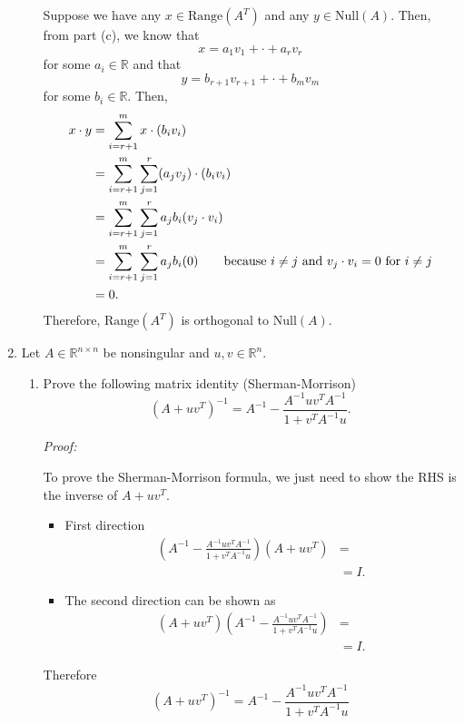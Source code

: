 \documentclass[a4paper,12pt]{article}
\newcommand{\reals}{\mathbb{R}}
\newcommand{\nul}{\mathrm{Null}}
\newcommand{\rng}{\mathrm{Range}}
\newenvironment{proof}[2][$\square$]
    {\setlength{\parskip}{0pt}\par\textit{Proof:} #2\setlength{\parskip}{0.25cm}
        \savebox{\qed}{#1}
        \begin{adjustwidth}{\widthof{Proof:}}{}
    }
    {
        \hfill\usebox{\qed}\end{adjustwidth}
    }
\begin{document}
\begin{enumerate}[label = \arabic*.]
\begin{enumerate}[label = (\alph*)]
				Suppose we have any $ x \in \rng(A^T) $ and any $ y \in \nul(A) $. Then, from part (c), we know that 
				\[
					x = a_1 v_1 + \cdot + a_r v_r
				\]
				for some $ a_i \in \reals $ and that
				\[
				y = b_{r + 1} v_{r + 1} + \cdot + b_m v_m
				\]
				for some $ b_i \in \reals $. Then, 
				\begin{align*}
					x \cdot y &= \sum_{i = r + 1}^{m} x \cdot (b_i v_i) \\
					&= \sum_{i = r + 1}^{m} \sum_{j = 1}^{r} (a_j v_j) \cdot (b_i v_i) \\
					&= \sum_{i = r + 1}^{m} \sum_{j = 1}^{r} a_j b_i (v_j \cdot v_i) \\
					&= \sum_{i = r + 1}^{m} \sum_{j = 1}^{r} a_j b_i (0) \qquad \text{because $ i \neq j $ and $ v_j \cdot v_i = 0 $ for $ i \neq j $} \\
					&= 0.
				\end{align*}
				Therefore, $ \rng(A^T) $ is orthogonal to $ \nul(A) $.
			\end{enumerate}
		
		\item Let $ A \in \reals^{n \times n} $	be nonsingular and $ u, v \in \reals^n $.
			\begin{enumerate}[label = (\alph*)]
				\item Prove the following matrix identity (Sherman-Morrison)
				\[
					(A + u v^T)^{-1} = A^{-1} - \frac{A^{-1} u v^T A^{-1}}{1 + v^T A^{-1} u}.
				\]
				
				\begin{proof}{}
					To prove the Sherman-Morrison formula, we just need to show the RHS is the inverse of $ A + uv^T $.
					\begin{itemize}
						\item First direction
						\begin{align*}
							\left(A^{-1} - \frac{A^{-1} u v^T A^{-1}}{1 + v^T A^{-1} u}\right) (A + u v^T) &= \\
							&= I.
						\end{align*}
					\item The second direction can be shown as
						\begin{align*}
							(A + u v^T) \left(A^{-1} - \frac{A^{-1} u v^T A^{-1}}{1 + v^T A^{-1} u}\right) &= \\
							&= I.
						\end{align*}
					\end{itemize}
					Therefore
					\[
						(A + u v^T)^{-1} = A^{-1} - \frac{A^{-1} u v^T A^{-1}}{1 + v^T A^{-1} u}
					\]
				\end{proof}
			\end{enumerate}
\end{enumerate}
\end{document}
